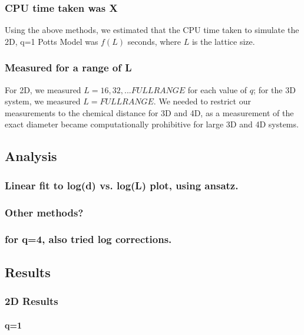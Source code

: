 \documentclass{article}
\begin{document}
\subsubsection{CPU time taken was X}
\label{sec-2.1.7}

Using the above methods, we estimated that the CPU time taken to simulate the 2D, q=1 Potts Model was $f(L)$ seconds, where $L$ is the lattice size.
\subsubsection{Measured for a range of L}
\label{sec-2.1.8}

For 2D, we measured $L=16,32,...FULL RANGE$ for each value of $q$; for the 3D system, we measured $L=FULL RANGE$. We needed to restrict our measurements to the chemical distance for 3D and 4D, as a measurement of the exact diameter became computationally prohibitive for large 3D and 4D systems.
\subsection{Analysis}
\label{sec-2.2}
\subsubsection{Linear fit to log(d) vs. log(L) plot, using ansatz.}
\label{sec-2.2.1}
\subsubsection{Other methods?}
\label{sec-2.2.2}
\subsubsection{for q=4, also tried log corrections.}
\label{sec-2.2.3}
\subsection{Results}
\label{sec-2.3}
\subsubsection{2D Results}
\label{sec-2.3.1}
\paragraph{q=1}
\label{sec-2.3.1.1}
\end{document}

